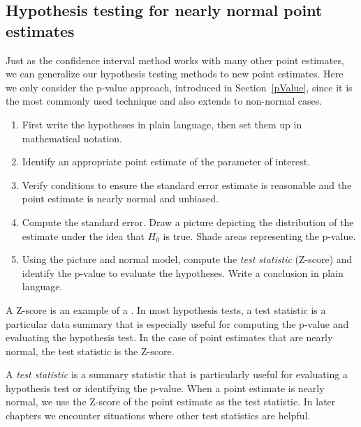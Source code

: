 \subsection{Hypothesis testing for nearly normal point estimates}

Just as the confidence interval method works with many other point estimates, we can generalize our hypothesis testing methods to new point estimates. Here we only consider the p-value approach, introduced in Section~\ref{pValue}, since it is the most commonly used technique and also extends to non-normal cases.

\begin{termBox}{
	\begin{enumerate}
		\setlength{\itemsep}{0mm}
		\item First write the hypotheses in plain language, then set them up in mathematical notation.
		\item Identify an appropriate point estimate of the parameter of interest.
		\item Verify conditions to ensure the standard error estimate is reasonable and the point estimate is nearly normal and unbiased.
		\item Compute the standard error. Draw a picture depicting the distribution of the estimate under the idea that $H_0$ is true. Shade areas representing the p-value.
		\item Using the picture and normal model, compute the \emph{test statistic} (Z-score) and identify the p-value to evaluate the hypotheses. Write a conclusion in plain language.
	\end{enumerate}}
\end{termBox}


A Z-score is an example of a . In most hypothesis tests, a test statistic is a particular data summary that is especially useful for computing the p-value and evaluating the hypothesis test. In the case of point estimates that are nearly normal, the test statistic is the Z-score.

\begin{termBox}{
A \emph{test statistic} is a summary statistic that is particularly useful for evaluating a hypothesis test or identifying the p-value. When a point estimate is nearly normal, we use the Z-score of the point estimate as the test statistic. In later chapters we encounter situations where other test statistics are helpful.}
\end{termBox}


